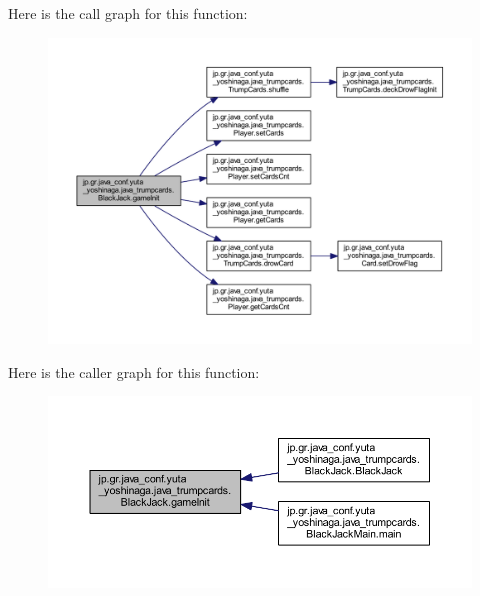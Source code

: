 Here is the call graph for this function\+:
\nopagebreak
\begin{figure}[H]
\begin{center}
\leavevmode
\includegraphics[width=350pt]{classjp_1_1gr_1_1java__conf_1_1yuta__yoshinaga_1_1java__trumpcards_1_1_black_jack_aecf1c840d9643b4809cd5e93710256a4_cgraph}
\end{center}
\end{figure}
Here is the caller graph for this function\+:
\nopagebreak
\begin{figure}[H]
\begin{center}
\leavevmode
\includegraphics[width=350pt]{classjp_1_1gr_1_1java__conf_1_1yuta__yoshinaga_1_1java__trumpcards_1_1_black_jack_aecf1c840d9643b4809cd5e93710256a4_icgraph}
\end{center}
\end{figure}
\mbox{\label{classjp_1_1gr_1_1java__conf_1_1yuta__yoshinaga_1_1java__trumpcards_1_1_black_jack_a26f4a11e36c237ec64f08010b8ea0a01}} 
